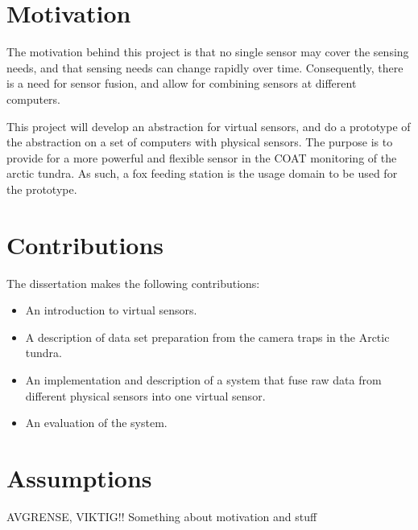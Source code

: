 \documentclass[USenglish]{uit-thesis}
\begin{document}


\section{Motivation}

The motivation  behind this project is that no single sensor may cover the sensing needs, and that sensing needs can change rapidly over time. Consequently, there is a need for sensor fusion, and allow for combining sensors at different computers.

This project will develop an abstraction for virtual sensors, and do a prototype of the abstraction on a set of computers with physical sensors. The purpose is to provide for a more powerful and flexible sensor in the COAT monitoring of the arctic tundra. As such, a fox feeding station is the usage domain to be used for the prototype.

\section{Contributions}

The dissertation makes the following contributions:
\begin{itemize}
\item An introduction to virtual sensors.
\item A description of data set preparation from the camera traps in the Arctic tundra.
\item An implementation and description of a system that fuse raw data from different physical sensors into one virtual sensor.
\item An evaluation of the system.
\end{itemize}


\section{Assumptions}
AVGRENSE, VIKTIG!!
Something about motivation and stuff
\end{document}
